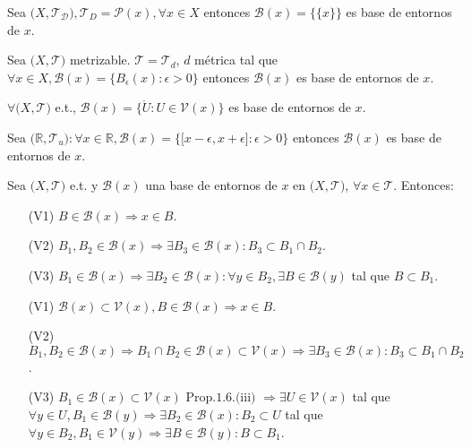 \begin{ejm}
  Sea $\big( X, \mathcal{T_{D}} \big), \mathcal{T}_{D} = \mathcal{P}(x), \forall x \in X$ entonces $\mathcal{B}(x) =  \{ \{ x \} \}$ es base de entornos de $x$.
\end{ejm}

\begin{ejm}
  Sea $\big( X, \mathcal{T} \big)$ metrizable. $ \mathcal{T} = \mathcal{T}_{d}$, $d$ métrica tal que $\forall x \in X, \mathcal{B}(x) = \{ B_{\epsilon}(x) : \epsilon > 0 \}$ entonces $\mathcal{B}(x)$ es base de entornos de $x$.
\end{ejm}

\begin{ejm}
  $\forall \big( X, \mathcal{T} \big)$ e.t., $ \mathcal{B}(x) = \{  \mathring{U} : U \in \mathcal{V}(x) \}$ es base de entornos de $x$.
\end{ejm}

\begin{ejm}
  Sea $\big( \mathbb{R}, \mathcal{T}_{u} \big) : \forall x \in \mathbb{R}, \mathcal{B}(x) =  \{ \big[ x-\epsilon, x + \epsilon \big] : \epsilon > 0  \}$ entonces $\mathcal{B}(x)$ es base de entornos de $x$.
\end{ejm}

\begin{prop}
  Sea $\big( X, \mathcal{T} \big)$ e.t. y $\mathcal{B}(x)$ una base de entornos de $x$ en $\big( X, \mathcal{T} \big)$, $\forall x \in \mathcal{T}$. Entonces:
  \begin{enumerate}[label=(\roman*)]
    \item [(V1)] $B \in \mathcal{B}(x) \Rightarrow x \in B$.
    \item [(V2)] $B_{1},B_{2} \in \mathcal{B}(x) \Rightarrow \exists B_{3} \in \mathcal{B}(x): B_{3} \subset B_{1} \cap B_{2}$.
    \item [(V3)] $B_{1} \in \mathcal{B}(x) \Rightarrow \exists B_{2} \in \mathcal{B}(x): \forall y \in B_{2}, \exists B \in \mathcal{B}(y)$ tal que $ B \subset B_{1}$.
  \end{enumerate}
\end{prop}

\begin{dem}
  \begin{enumerate}[label=(\roman*)]
    \item [(V1)] $\mathcal{B}(x) \subset \mathcal{V}(x), B \in \mathcal{B}(x) \Rightarrow x \in B$.
    \item [(V2)] $B_{1}, B_{2} \in \mathcal{B}(x) \Rightarrow B_{1} \cap B_{2} \in \mathcal{B}(x) \subset \mathcal{V}(x) \Rightarrow \exists B_{3} \in \mathcal{B}(x): B_{3} \subset B_{1} \cap B_{2}$.
    \item [(V3)] $B_{1} \in \mathcal{B}(x) \subset \mathcal{V}(x) \text{ Prop.1.6.(iii) } \Rightarrow \exists U \in \mathcal{V}(x)$ tal que $\forall y \in U, B_{1} \in \mathcal{B}(y) \Rightarrow \exists B_{2} \in \mathcal{B}(x) : B_{2} \subset U$ tal que $\forall y \in B_{2}, B_{1} \in \mathcal{V}(y) \Rightarrow \exists B \in \mathcal{B}(y): B \subset B_{1}$.
  \end{enumerate}
\end{dem}

